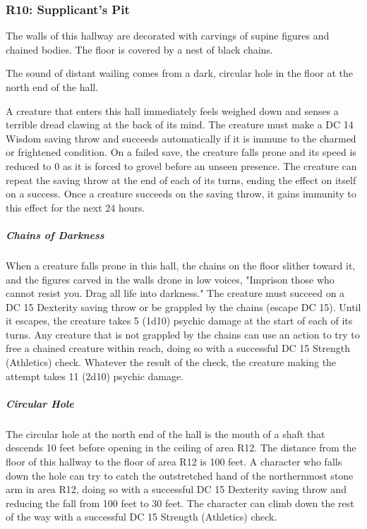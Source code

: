 \documentclass[10pt,a4paper,twoside,fancy,bg=print,twocolumn,openany,nodeprecatedcode]{dndbook}
\begin{document}
\subsubsection{R10: Supplicant's Pit}
\begin{DndReadAloud}{}
The walls of this hallway are decorated with carvings of supine figures and chained bodies. The floor is covered by a nest of black chains.

The sound of distant wailing comes from a dark, circular hole in the floor at the north end of the hall.

\end{DndReadAloud}

A creature that enters this hall immediately feels weighed down and senses a terrible dread clawing at the back of its mind. The creature must make a DC 14 Wisdom saving throw and succeeds automatically if it is immune to the charmed or frightened condition. On a failed save, the creature falls prone and its speed is reduced to 0 as it is forced to grovel before an unseen presence. The creature can repeat the saving throw at the end of each of its turns, ending the effect on itself on a success. Once a creature succeeds on the saving throw, it gains immunity to this effect for the next 24 hours.

\subparagraph{Chains of Darkness}
When a creature falls prone in this hall, the chains on the floor slither toward it, and the figures carved in the walls drone in low voices, "Imprison those who cannot resist you. Drag all life into darkness." The creature must succeed on a DC 15 Dexterity saving throw or be grappled by the chains (escape DC 15). Until it escapes, the creature takes 5 (1d10) psychic damage at the start of each of its turns. Any creature that is not grappled by the chains can use an action to try to free a chained creature within reach, doing so with a successful DC 15 Strength (Athletics) check. Whatever the result of the check, the creature making the attempt takes 11 (2d10) psychic damage.

\subparagraph{Circular Hole}
The circular hole at the north end of the hall is the mouth of a shaft that descends 10 feet before opening in the ceiling of area R12. The distance from the floor of this hallway to the floor of area R12 is 100 feet. A character who falls down the hole can try to catch the outstretched hand of the northernmost stone arm in area R12, doing so with a successful DC 15 Dexterity saving throw and reducing the fall from 100 feet to 30 feet. The character can climb down the rest of the way with a successful DC 15 Strength (Athletics) check.
\end{document}
